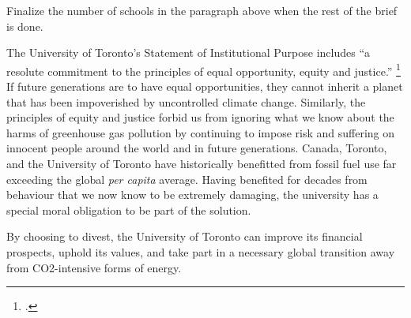 \begin{vcom}
Finalize the number of schools in the paragraph above when the rest of the brief is done.
\end{vcom}



The University of Toronto's Statement of Institutional Purpose includes ``a resolute commitment to the principles of equal opportunity, equity and justice.'' \footcite{InstitutionalPurpose}
If future generations are to have equal opportunities, they cannot inherit a planet that has been impoverished by uncontrolled climate change.
Similarly, the principles of equity and justice forbid us from ignoring what we know about the harms of greenhouse gas pollution by continuing to impose risk and suffering on innocent people around the world and in future generations.
Canada, Toronto, and the University of Toronto have historically benefitted from fossil fuel use far exceeding the global \emph{per capita} average.
Having benefited for decades from behaviour that we now know to be extremely damaging, the university has a special moral obligation to be part of the solution.



By choosing to divest, the University of Toronto can improve its financial prospects, uphold its values, and take part in a necessary global transition away from CO2-intensive forms of energy. 



